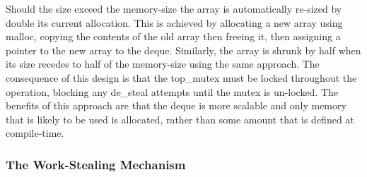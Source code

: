 Should the size exceed the memory-size the array is automatically re-sized by double its current allocation. 
This is achieved by allocating a new array using malloc, copying the contents of the old array then freeing it, 
then assigning a pointer to the new array to the deque. 
Similarly, the array is shrunk by half when its size recedes to half of the memory-size using the same approach.
The consequence of this design is that the top\_mutex must be locked throughout the operation, blocking any de\_steal
attempts until the mutex is un-locked. 
The benefits of this approach are that the deque is more scalable and only memory that is likely to be used is allocated, 
rather than some amount that is defined at compile-time.

\subsubsection*{The Work-Stealing Mechanism}


